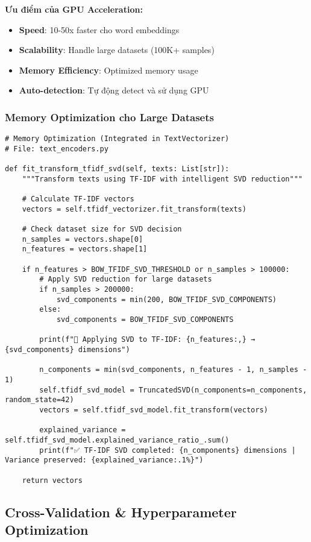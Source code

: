 \textbf{Ưu điểm của GPU Acceleration:}
\begin{itemize}
    \item \textbf{Speed}: 10-50x faster cho word embeddings
    \item \textbf{Scalability}: Handle large datasets (100K+ samples)
    \item \textbf{Memory Efficiency}: Optimized memory usage
    \item \textbf{Auto-detection}: Tự động detect và sử dụng GPU
\end{itemize}

\subsubsection{Memory Optimization cho Large Datasets}

\begin{verbatim}
# Memory Optimization (Integrated in TextVectorizer)
# File: text_encoders.py

def fit_transform_tfidf_svd(self, texts: List[str]):
    """Transform texts using TF-IDF with intelligent SVD reduction"""
    
    # Calculate TF-IDF vectors
    vectors = self.tfidf_vectorizer.fit_transform(texts)
    
    # Check dataset size for SVD decision
    n_samples = vectors.shape[0]
    n_features = vectors.shape[1]
    
    if n_features > BOW_TFIDF_SVD_THRESHOLD or n_samples > 100000:
        # Apply SVD reduction for large datasets
        if n_samples > 200000:
            svd_components = min(200, BOW_TFIDF_SVD_COMPONENTS)
        else:
            svd_components = BOW_TFIDF_SVD_COMPONENTS
        
        print(f"🔧 Applying SVD to TF-IDF: {n_features:,} → {svd_components} dimensions")
        
        n_components = min(svd_components, n_features - 1, n_samples - 1)
        self.tfidf_svd_model = TruncatedSVD(n_components=n_components, random_state=42)
        vectors = self.tfidf_svd_model.fit_transform(vectors)
        
        explained_variance = self.tfidf_svd_model.explained_variance_ratio_.sum()
        print(f"✅ TF-IDF SVD completed: {n_components} dimensions | Variance preserved: {explained_variance:.1%}")
    
    return vectors
\end{verbatim}


\subsection{Cross-Validation \& Hyperparameter Optimization}

